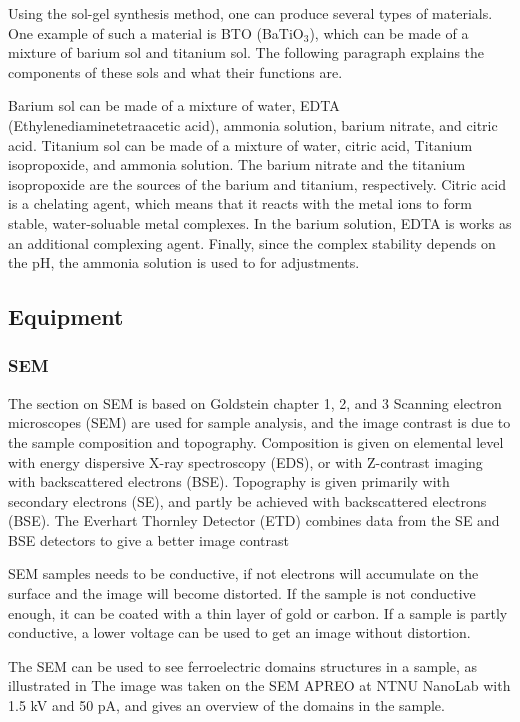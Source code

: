 \noindent Using the sol-gel synthesis method, one can produce several types of materials. 
One example of such a material is BTO (BaTiO$_3$), which can be made of a mixture of barium sol and titanium sol. 
The following paragraph explains the components of these sols and what their functions are.

Barium sol can be made of a mixture of water, EDTA (Ethylenediaminetetraacetic acid), ammonia solution, barium nitrate, and citric acid. 
Titanium sol can be made of a mixture of water, citric acid, Titanium isopropoxide, and ammonia solution.
The barium nitrate and the titanium isopropoxide are the sources of the barium and titanium, respectively.
Citric acid is a chelating agent, which means that it reacts with the metal ions to form stable, water-soluable metal complexes.
In the barium solution, EDTA is works as an additional complexing agent. 
Finally, since the complex stability depends on the pH, the ammonia solution is used to for adjustments.

\subsection{Equipment}

\subsubsection{SEM}

\noindent The section on SEM is based on Goldstein chapter 1, 2, and 3 %
Scanning electron microscopes (SEM) are used for sample analysis, and the image contrast is due to the sample composition and topography.
Composition is given on elemental level with energy dispersive X-ray spectroscopy (EDS), or with Z-contrast imaging with backscattered electrons (BSE).
Topography is given primarily with secondary electrons (SE), and partly be achieved with backscattered electrons (BSE).
The Everhart Thornley Detector (ETD) combines data from the SE and BSE detectors to give a better image contrast %


SEM samples needs to be conductive, if not electrons will accumulate on the surface and the image will become distorted.
If the sample is not conductive enough, it can be coated with a thin layer of gold or carbon.
If a sample is partly conductive, a lower voltage can be used to get an image without distortion.

The SEM can be used to see ferroelectric domains structures in a sample, as illustrated in %
The image was taken on the SEM APREO at NTNU NanoLab with 1.5 kV and 50 pA, and gives an overview of the domains in the sample.

